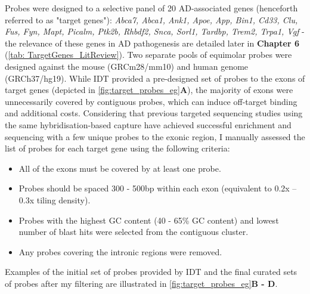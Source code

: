 
Probes were designed to a selective panel of 20 AD-associated genes (henceforth referred to as "target genes"): \textit{Abca7, Abca1, Ank1, Apoe, App, Bin1, Cd33, Clu, Fus, Fyn, Mapt, Picalm, Ptk2b, Rhbdf2, Snca, Sorl1, Tardbp, Trem2, Trpa1, Vgf} - the relevance of these genes in AD pathogenesis are detailed later in \textbf{Chapter 6} (\cref{tab: TargetGenes_LitReview}). Two separate pools of equimolar probes were designed against the mouse (GRCm28/mm10) and human genome (GRCh37/hg19). While IDT provided a pre-designed set of probes to the exons of target genes (depicted in \cref{fig:target_probes_eg}\textbf{A}), the majority of exons were unnecessarily covered by contiguous probes, which can induce off-target binding and additional costs. Considering that previous targeted sequencing studies using the same hybridisation-based capture have achieved successful enrichment and sequencing with a few unique probes to the exonic region\cite{Sheynkman2020}, I manually assessed the list of probes for each target gene using the following criteria:
\begin{itemize}
	\item All of the exons must be covered by at least one probe.
	\item Probes should be spaced 300 - 500bp within each exon (equivalent to 0.2x – 0.3x tiling density). 
	\item Probes with the highest GC content (40 - 65\% GC content) and lowest number of blast hits were selected from the contiguous cluster. 
	\item Any probes covering the intronic regions were removed.
\end{itemize}
Examples of the initial set of probes provided by IDT and the final curated sets of probes after my filtering are illustrated in  \cref{fig:target_probes_eg}\textbf{B - D}. 

